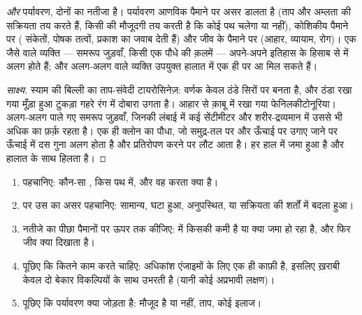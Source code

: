 \begin{proposition}\label{prop:g11:enzymes-and-phenotype:environment}
  \emph{और} पर्यावरण, दोनों का नतीजा है। पर्यावरण
आणविक पैमाने पर असर डालता है (ताप और अम्लता  की सक्रियता तय करते
हैं, किसी  की मौजूदगी तय करती है कि कोई पथ चलेगा या नहीं),
कोशिकीय पैमाने पर ( संकेतों, पोषक तत्वों, प्रकाश का जवाब देती हैं)
और जीव के पैमाने पर (आहार, व्यायाम, रोग)। एक जैसे  वाले व्यक्ति
--- समरूप जुड़वाँ, किसी एक पौधे की क़लमें --- अपने-अपने इतिहास के हिसाब से
 में अलग होते हैं; और अलग-अलग  वाले व्यक्ति उपयुक्त
हालात में एक ही  पर आ मिल सकते हैं।
\end{proposition}
\begin{proof}[साक्ष्य]
स्याम की बिल्ली का ताप-संवेदी टायरोसिनेज़: वर्णक केवल ठंडे सिरों पर बनता
है, और ठंडा रखा गया मूँड़ा हुआ टुकड़ा गहरे रंग में दोबारा उगता है। आहार से
क़ाबू में रखा गया फेनिलकीटोनूरिया। अलग-अलग पाले गए समरूप जुड़वाँ, जिनकी
लंबाई में कई सेंटीमीटर और शरीर-द्रव्यमान में उससे भी अधिक का फ़र्क़ रहता
है। एक ही क्लोन का पौधा, जो समुद्र-तल पर और ऊँचाई पर उगाए जाने पर ऊँचाई
में दस गुना अलग होता है और प्रतिरोपण करने पर लौट आता है। हर हाल में
 जमा हुआ है और  हालात के साथ हिलता है।
\end{proof}

\begin{method}[जीन से लक्षण तक तर्क करना]\label{met:g11:enzymes-and-phenotype:reason}
\begin{enumerate}
  \item {} पहचानिए: कौन-सा , किस पथ में, और वह करता क्या है।
  \item {} पर उस  का असर पहचानिए: सामान्य, घटा हुआ,
        अनुपस्थित, या सक्रियता की शर्तों में बदला हुआ।
  \item नतीजे का पीछा पैमानों पर ऊपर तक कीजिए:  में किसकी कमी है या
        क्या जमा हो रहा है, और फिर जीव क्या दिखाता है।
  \item पूछिए कि कितने काम करते  चाहिए: अधिकांश एंजाइमों के लिए एक
        ही काफ़ी है, इसलिए ख़राबी केवल दो बेकार विकल्पियों के साथ उभरती है
        (यानी कोई अप्रभावी लक्षण)।
  \item पूछिए कि पर्यावरण क्या जोड़ता है:  मौजूद है या नहीं, ताप,
        कोई इलाज।
\end{enumerate}
\end{method}

